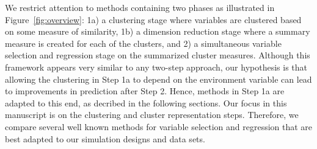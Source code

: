 We restrict attention to methods containing two phases as illustrated in Figure~\ref{fig:overview}: 1a) a clustering stage where variables are clustered based on some measure of similarity, 1b) a dimension reduction stage where a summary measure is created for each of the  clusters, and 2) a simultaneous variable selection and regression stage on the summarized cluster measures.
Although this framework appears very similar to any two-step approach,  
our hypothesis is that allowing the clustering in Step 1a to depend on the environment variable can lead to improvements in prediction after Step 2.  Hence, methods in Step 1a are adapted to this end, as decribed in the following sections. Our focus in this manuscript is on the clustering and cluster representation steps. Therefore,  we compare several well known methods for variable selection and regression that are best adapted to our simulation designs and data sets.



